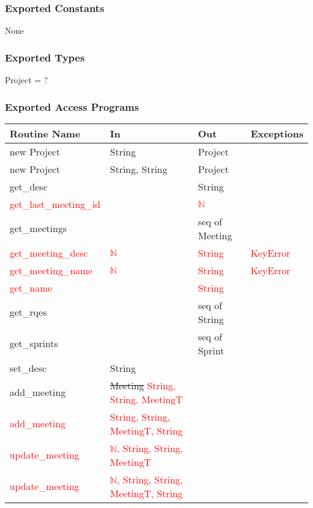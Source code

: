 \documentclass[12pt, titlepage]{article}
\begin{document}
\subsubsection* {Exported Constants}
None

\subsubsection* {Exported Types}
Project = ?

\subsubsection* {Exported Access Programs}
\begin{tabular}{|l|l|l|l|}
    \hline
    \textbf{Routine Name} & \textbf{In} & \textbf{Out} & \textbf{Exceptions} \\
    \hline
    new Project & String & Project & \\
    \hline
    new Project & String, String & Project & \\
    \hline
    get\_desc & & String &\\
    \hline
    \textcolor{red}{get\_last\_meeting\_id} & & \textcolor{red}{$\mathbb{N}$}&\\
    \hline
    get\_meetings & & seq of Meeting &\\
    \hline
    \textcolor{red}{get\_meeting\_desc} & \textcolor{red}{$\mathbb{N}$}& \textcolor{red}{String} & \textcolor{red}{KeyError}\\
    \hline
    \textcolor{red}{get\_meeting\_name} & \textcolor{red}{$\mathbb{N}$}& \textcolor{red}{String} & \textcolor{red}{KeyError}\\
    \hline
    \textcolor{red}{get\_name} & & \textcolor{red}{String}&\\
    \hline
    get\_rqes & & seq of String & \\
    \hline
    get\_sprints & & seq of Sprint & \\
    \hline
    set\_desc & String & &\\
    \hline
    add\_meeting & \sout{Meeting} \textcolor{red}{String, String, MeetingT}& & \\
    \hline
    \textcolor{red}{add\_meeting} & \textcolor{red}{String, String, MeetingT, String}& & \\
    \hline
    \textcolor{red}{update\_meeting} & \textcolor{red}{$\mathbb{N}$, String, String, MeetingT}& & \\
    \hline
    \textcolor{red}{update\_meeting} & \textcolor{red}{$\mathbb{N}$, String, String, MeetingT, String}& & \\

\end{tabular}
\end{document}
